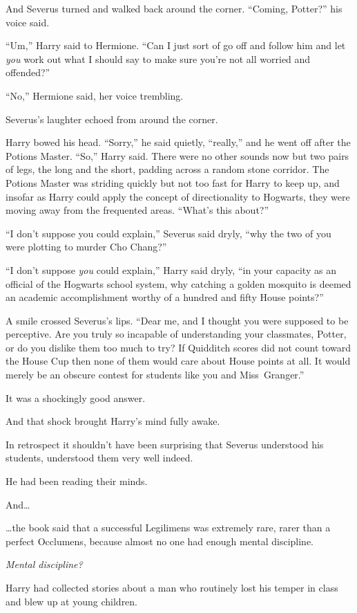 And Severus turned and walked back around the corner. “Coming, Potter?” his
voice said.

“Um,” Harry said to Hermione. “Can I just sort of go off and follow him and let
\emph{you} work out what I should say to make sure you’re not all worried and
offended?”

“No,” Hermione said, her voice trembling.

Severus’s laughter echoed from around the corner.

Harry bowed his head. “Sorry,” he said quietly, “really,” and he went off after
the Potions Master.
\later
“So,” Harry said. There were no other sounds now but two pairs of legs, the
long and the short, padding across a random stone corridor. The Potions Master
was striding quickly but not too fast for Harry to keep up, and insofar as
Harry could apply the concept of directionality to Hogwarts, they were moving
away from the frequented areas. “What’s this about?”

“I don’t suppose you could explain,” Severus said dryly, “why the two of you
were plotting to murder Cho Chang?”

“I don’t suppose \emph{you} could explain,” Harry said dryly, “in your capacity
as an official of the Hogwarts school system, why catching a golden mosquito is
deemed an academic accomplishment worthy of a hundred and fifty House points?”

A smile crossed Severus’s lips. “Dear me, and I thought you were supposed to be
perceptive. Are you truly so incapable of understanding your classmates,
Potter, or do you dislike them too much to try? If Quidditch scores did not
count toward the House Cup then none of them would care about House points at
all. It would merely be an obscure contest for students like you and
Miss~Granger.”

It was a shockingly good answer.

And that shock brought Harry’s mind fully awake.

In retrospect it shouldn’t have been surprising that Severus understood his
students, understood them very well indeed.

He had been reading their minds.

And…

…the book said that a successful Legilimens was extremely rare, rarer
than a perfect Occlumens, because almost no one had enough mental discipline.

\emph{Mental discipline?}

Harry had collected stories about a man who routinely lost his temper in class
and blew up at young children.

